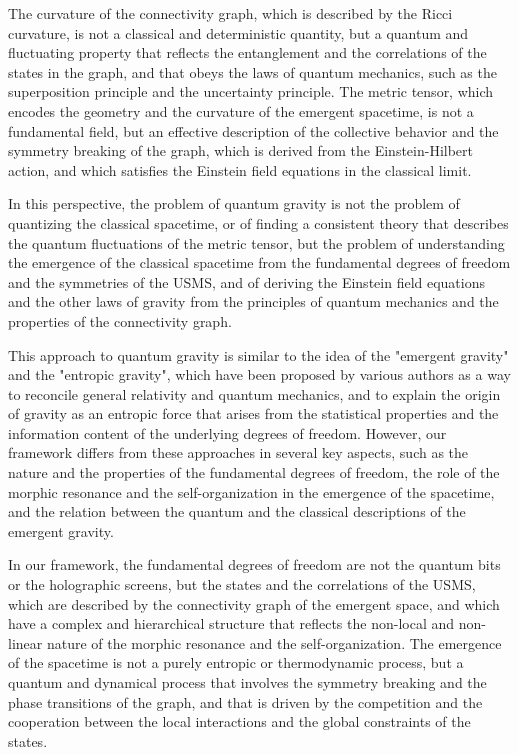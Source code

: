 \begin{tcolorbox}[colback=green!5!white,colframe=green!75!black,title=Question]
    The curvature of the connectivity graph, which is described by the Ricci curvature, is not a classical and deterministic quantity, but a quantum and fluctuating property that reflects the entanglement and the correlations of the states in the graph, and that obeys the laws of quantum mechanics, such as the superposition principle and the uncertainty principle. The metric tensor, which encodes the geometry and the curvature of the emergent spacetime, is not a fundamental field, but an effective description of the collective behavior and the symmetry breaking of the graph, which is derived from the Einstein-Hilbert action, and which satisfies the Einstein field equations in the classical limit.

    In this perspective, the problem of quantum gravity is not the problem of quantizing the classical spacetime, or of finding a consistent theory that describes the quantum fluctuations of the metric tensor, but the problem of understanding the emergence of the classical spacetime from the fundamental degrees of freedom and the symmetries of the USMS, and of deriving the Einstein field equations and the other laws of gravity from the principles of quantum mechanics and the properties of the connectivity graph.

    This approach to quantum gravity is similar to the idea of the "emergent gravity" and the "entropic gravity", which have been proposed by various authors as a way to reconcile general relativity and quantum mechanics, and to explain the origin of gravity as an entropic force that arises from the statistical properties and the information content of the underlying degrees of freedom. However, our framework differs from these approaches in several key aspects, such as the nature and the properties of the fundamental degrees of freedom, the role of the morphic resonance and the self-organization in the emergence of the spacetime, and the relation between the quantum and the classical descriptions of the emergent gravity.

    In our framework, the fundamental degrees of freedom are not the quantum bits or the holographic screens, but the states and the correlations of the USMS, which are described by the connectivity graph of the emergent space, and which have a complex and hierarchical structure that reflects the non-local and non-linear nature of the morphic resonance and the self-organization. The emergence of the spacetime is not a purely entropic or thermodynamic process, but a quantum and dynamical process that involves the symmetry breaking and the phase transitions of the graph, and that is driven by the competition and the cooperation between the local interactions and the global constraints of the states.


\end{tcolorbox}

